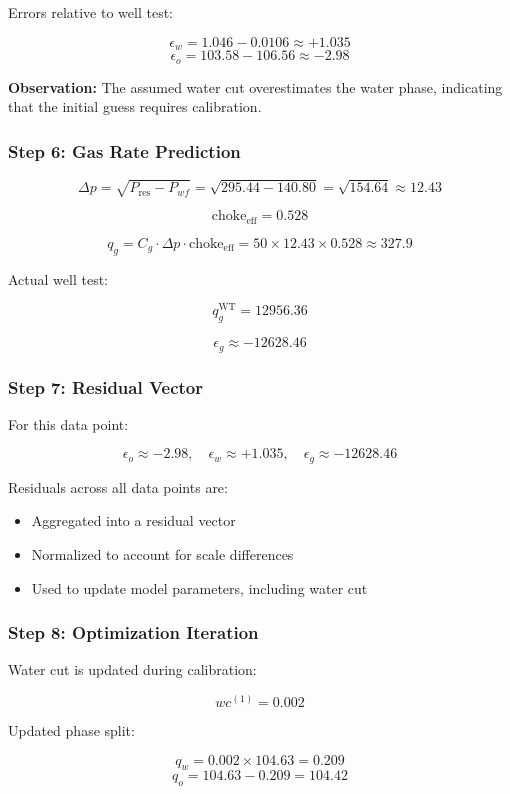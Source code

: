 \documentclass[12pt,APA]{uomthesis}
\begin{document}
Errors relative to well test:

\[
\epsilon_w = 1.046 - 0.0106 \approx +1.035
\]
\[
\epsilon_o = 103.58 - 106.56 \approx -2.98
\]

\noindent
\textbf{Observation:} The assumed water cut overestimates the water phase, indicating that the initial guess requires calibration.

\subsubsection*{Step 6: Gas Rate Prediction}
\[
\Delta p = \sqrt{P_{\text{res}} - P_{wf}} = \sqrt{295.44 - 140.80}
= \sqrt{154.64} \approx 12.43
\]

\[
\text{choke}_{\text{eff}} = 0.528
\]

\[
q_g = C_g \cdot \Delta p \cdot \text{choke}_{\text{eff}}
= 50 \times 12.43 \times 0.528 \approx 327.9
\]

Actual well test:

\[
q_g^{\text{WT}} = 12956.36
\]

\[
\epsilon_g \approx -12628.46
\]


\subsubsection*{Step 7: Residual Vector}
For this data point:

\[
\epsilon_o \approx -2.98, \quad
\epsilon_w \approx +1.035, \quad
\epsilon_g \approx -12628.46
\]

Residuals across all data points are:

\begin{itemize}
\item Aggregated into a residual vector
\item Normalized to account for scale differences
\item Used to update model parameters, including water cut
\end{itemize}

\subsubsection*{Step 8: Optimization Iteration}
Water cut is updated during calibration:

\[
wc^{(1)} = 0.002
\]

Updated phase split:

\[
q_w = 0.002 \times 104.63 = 0.209
\]
\[
q_o = 104.63 - 0.209 = 104.42
\]
\end{document}
